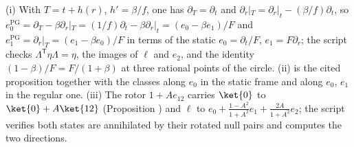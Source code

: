 (i) With $T = t + h(r)$, $h' = \beta/f$, one has $\partial_{T} = \partial_{t}$ and $\partial_{r}|_{T} = \partial_{r}|_{t} - (\beta/f)\partial_{t}$, so $e_{0}^{\mathrm{PG}} = \partial_{T} - \beta\partial_{r}|_{T} = (1/f)\partial_{t} - \beta\partial_{r}|_{t} = (e_{0} - \beta e_{1})/F$ and $e_{1}^{\mathrm{PG}} = \partial_{r}|_{T} = (e_{1} - \beta e_{0})/F$ in terms of the static $e_{0} = \partial_{t}/F$, $e_{1} = F\partial_{r}$; the script checks $\Lambda^{\mathsf T}\eta\Lambda = \eta$, the images of $\ell$ and $e_{2}$, and the identity $(1 - \beta)/F = F/(1 + \beta)$ at three rational points of the circle. (ii) is the cited proposition together with the classes along $e_{0}$ in the static frame and along $e_{0}$, $e_{1}$ in the regular one. (iii) The rotor $1 + Ae_{12}$ carries $\ket{0}$ to $\ket{0} + A\ket{12}$ (Proposition ) and $\ell$ to $e_{0} + \frac{1 - A^{2}}{1 + A^{2}}e_{1} + \frac{2A}{1 + A^{2}}e_{2}$; the script verifies both states are annihilated by their rotated null pairs and computes the two directions.
